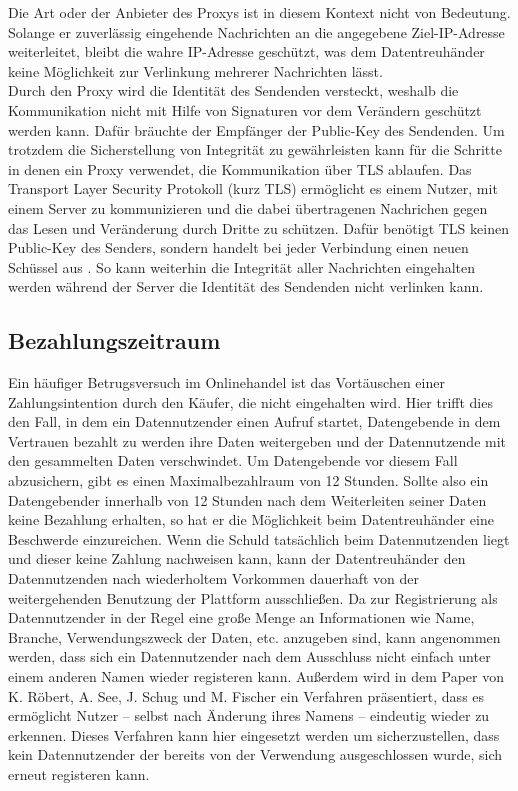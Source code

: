 \documentclass[
	fontsize=12pt,
	headings=small,
	parskip=half,           %
	bibliography=totoc,
	numbers=noenddot,       %
	open=any,               %
]{scrreprt}
\begin{document}
Die Art oder der Anbieter des Proxys ist in diesem Kontext nicht von Bedeutung. Solange er zuverlässig eingehende Nachrichten an die angegebene Ziel-IP-Adresse weiterleitet, bleibt die wahre IP-Adresse geschützt, was dem Datentreuhänder keine Möglichkeit zur Verlinkung mehrerer Nachrichten lässt.\\

Durch den Proxy wird die Identität des Sendenden versteckt, weshalb die Kommunikation nicht mit Hilfe von Signaturen vor dem Verändern geschützt werden kann. Dafür bräuchte der Empfänger der Public-Key des Sendenden. Um trotzdem die Sicherstellung von Integrität zu gewährleisten kann für die Schritte in denen ein Proxy verwendet, die Kommunikation über TLS ablaufen. Das Transport Layer Security Protokoll (kurz TLS) ermöglicht es einem Nutzer, mit einem Server zu kommunizieren und die dabei übertragenen Nachrichen gegen das Lesen und Veränderung durch Dritte zu schützen. Dafür benötigt TLS keinen Public-Key des Senders, sondern handelt bei jeder Verbindung einen neuen Schüssel aus \cite{Arfaoui2019The}. So kann weiterhin die Integrität aller Nachrichten eingehalten werden während der Server die Identität des Sendenden nicht verlinken kann.

\subsection{Bezahlungszeitraum}
\label{subsec:paymentTimespan}
Ein häufiger Betrugsversuch im Onlinehandel ist das Vortäuschen einer Zahlungsintention durch den Käufer, die nicht eingehalten wird. Hier trifft dies den Fall, in dem ein Datennutzender einen Aufruf startet, Datengebende in dem Vertrauen bezahlt zu werden ihre Daten weitergeben und der Datennutzende mit den gesammelten Daten verschwindet. Um Datengebende vor diesem Fall abzusichern, gibt es einen Maximalbezahlraum von 12 Stunden. Sollte also ein Datengebender innerhalb von 12 Stunden nach dem Weiterleiten seiner Daten keine Bezahlung erhalten, so hat er die Möglichkeit beim Datentreuhänder eine Beschwerde einzureichen. Wenn die Schuld tatsächlich beim Datennutzenden liegt und dieser keine Zahlung nachweisen kann, kann der Datentreuhänder den Datennutzenden nach wiederholtem Vorkommen dauerhaft von der weitergehenden Benutzung der Plattform ausschließen. Da zur Registrierung als Datennutzender in der Regel eine große Menge an Informationen wie Name, Branche, Verwendungszweck der Daten, etc. anzugeben sind, kann angenommen werden, dass sich ein Datennutzender nach dem Ausschluss nicht einfach unter einem anderen Namen wieder registeren kann. Außerdem wird in dem Paper  von K. Röbert, A. See, J. Schug und M. Fischer ein Verfahren präsentiert, dass es ermöglicht Nutzer -- selbst nach Änderung ihres Namens -- eindeutig wieder zu erkennen. Dieses Verfahren kann hier eingesetzt werden um sicherzustellen, dass kein Datennutzender der bereits von der Verwendung ausgeschlossen wurde, sich erneut registeren kann.\\
\end{document}
